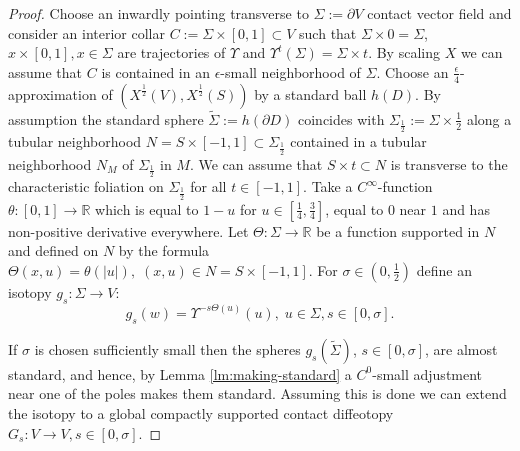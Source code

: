 \documentclass[12pt]{amsart}
\theoremstyle{plain}
\theoremstyle{definition}
\theoremstyle{remark}
\newcommand{\R}{\mathbb{R}}
\newcommand{\eps}{\epsilon}
\newcommand{\p}{\partial}
\newcommand{\wt}{\widetilde}
\begin{document}
 \begin{proof}
 Choose an inwardly pointing  transverse  to $\Sigma:=\p V$    contact vector field and  consider an interior collar $C:=\Sigma\times[0,1]\subset V$ such that $\Sigma\times 0=\Sigma$,  $x\times[0,1], x\in\Sigma$ are trajectories of $\Upsilon$ and $\Upsilon^t(\Sigma)=\Sigma\times t$. By scaling $X$ we can assume that $C$ is contained in  an $\eps$-small neighborhood of $\Sigma$.    
Choose an $\frac\eps4$-approximation of $(X^{\frac12}(V), X^{\frac12}(S))$ by a standard ball $ h(D)$.  By assumption the standard sphere $\wt\Sigma:=h(\p D)$ coincides with $\Sigma_{\frac12}:=\Sigma\times\frac12$ along a tubular neighborhood $N=S\times[-1,1]\subset\Sigma_{\frac12}$ contained in
a tubular neighborhood $N_M$  of $\Sigma_{\frac12}$ in $M.$ We can assume that $S\times t\subset N$ is transverse to the characteristic foliation on $\Sigma_{\frac12}$ for all $t\in[-1,1]$. Take a $C^\infty$-function
 $\theta:[0,1]\to\R$ which is equal to $1 -u $  for  $u\in [ \frac14,\frac34]$, equal to $0$ near $1$  and has non-positive derivative everywhere.
 Let $\Theta:\Sigma\to\R$  be a function supported in $N$ and defined
on $N$ by the formula  $\Theta(x,u)=\theta(|u|),\; (x,u)\in N=S\times[-1,1]. $
For   $\sigma\in(0,\frac12)$ define an isotopy $g_s:\Sigma\to V$:
$$g_s(w)=\Upsilon^{-s\Theta(u)}(u),\; u\in\Sigma, s\in[0,\sigma].$$

If $\sigma$ is chosen sufficiently small then the spheres  $g_s(\wt\Sigma)$, $s\in[0,\sigma]$, 
are almost standard, and hence, by Lemma \ref{lm:making-standard} a $C^0$-small adjustment near  one of the poles  makes them    standard. Assuming this is done we can extend  the isotopy to  a global compactly supported contact diffeotopy $G_s:V\to  V, s\in[0,\sigma].$


\end{proof}
\end{document}
